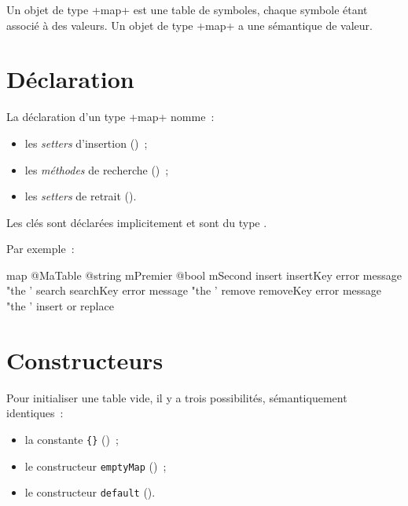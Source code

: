 



Un objet de type \ggst+map+ est une table de symboles, chaque symbole étant associé à des valeurs. Un objet de type \ggst+map+ a une sémantique de valeur.

\section{Déclaration}

La déclaration d'un type \ggst+map+ nomme~:
\begin{itemize}
  \item les \emph{setters} d'insertion ()~;
  \item les \emph{méthodes} de recherche ()~;
  \item les \emph{setters} de retrait ().
\end{itemize}

Les clés sont déclarées implicitement et sont du type .

Par exemple~:

\begin{galgas3}
map @MaTable {
  @string mPremier
  @bool mSecond
  insert insertKey error message "the '%
  search searchKey error message "the '%
  remove removeKey error message "the '%
  insert or replace
}
\end{galgas3}








\section{Constructeurs}

Pour initialiser une table vide, il y a trois possibilités, sémantiquement identiques~:
\begin{itemize}
  \item la constante \texttt{\{\}} ()~;
  \item le constructeur \texttt{emptyMap} ()~;
  \item le constructeur \texttt{default} ().
\end{itemize}


